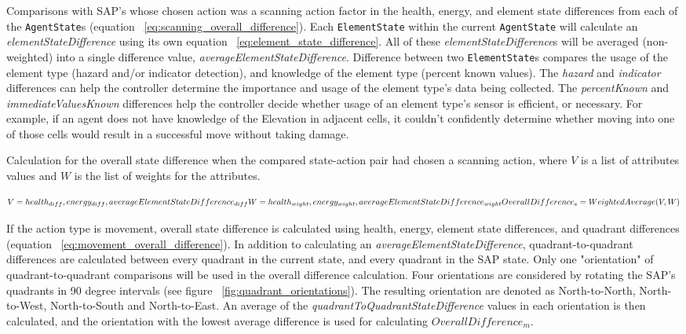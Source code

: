 Comparisons with SAP's whose chosen action was a scanning action factor in the health, energy, and element state differences from each of the \texttt{AgentState}s (equation ~\ref{eq:scanning_overall_difference}).
Each \texttt{ElementState} within the current \texttt{AgentState} will calculate an \textit{elementStateDifference} using its own equation ~\ref{eq:element_state_difference}.
All of these \textit{elementStateDifference}s will be averaged (non-weighted) into a single difference value, \textit{averageElementStateDifference}.
Difference between two \texttt{ElementState}s compares the usage of the element type (hazard and/or indicator detection), and knowledge of the element type (percent known values).
The \textit{hazard} and \textit{indicator} differences can help the controller determine the importance and usage of the element type's data being collected.
The \textit{percentKnown} and \textit{immediateValuesKnown} differences help the controller decide whether usage of an element type's sensor is efficient, or necessary.
For example, if an agent does not have knowledge of the Elevation in adjacent cells, it couldn't confidently determine whether moving into one of those cells would result in a successful move without taking damage.

\caption{Calculation for the overall state difference when the compared state-action pair had chosen a scanning action, where $V$ is a list of attributes values and $W$ is the list of weights for the attributes.}
\begin{equation} \label{eq:scanning_overall_difference}
  V = {health_{diff}, energy_{diff}, averageElementStateDifference_{diff}} \\
  W = {health_{wight}, energy_{wight}, averageElementStateDifference_{wight}} \\
  \\
  OverallDifference_{s} = WeightedAverage(V,W)
\end{equation}

If the action type is movement, overall state difference is calculated using health, energy, element state differences, and quadrant differences (equation ~\ref{eq:movement_overall_difference}).
In addition to calculating an \textit{averageElementStateDifference}, quadrant-to-quadrant differences are calculated between every quadrant in the current state, and every quadrant in the SAP state.
Only one "orientation" of quadrant-to-quadrant comparisons will be used in the overall difference calculation.
Four orientations are considered by rotating the SAP's quadrants in 90 degree intervals (see figure ~\ref{fig:quadrant_orientations}).
The resulting orientation are denoted as North-to-North, North-to-West, North-to-South and North-to-East.
An average of the \textit{quadrantToQuadrantStateDifference} values in each orientation is then calculated, and the orientation with the lowest average difference is used for calculating $OverallDifference_{m}$.

